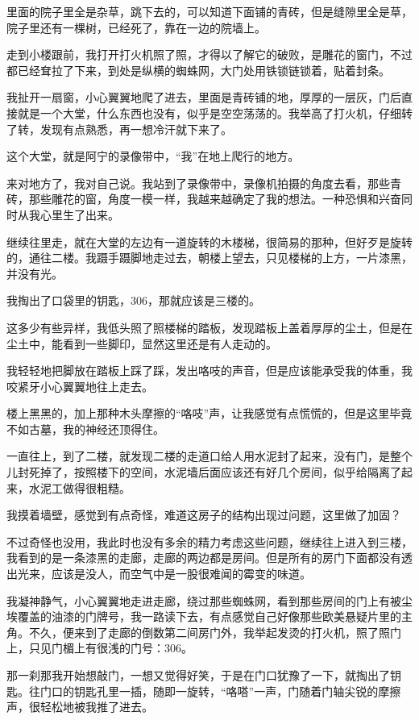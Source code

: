 里面的院子里全是杂草，跳下去的，可以知道下面铺的青砖，但是缝隙里全是草，院子里还有一棵树，已经死了，靠在一边的院墙上。

走到小楼跟前，我打开打火机照了照，才得以了解它的破败，是雕花的窗门，不过都已经耷拉了下来，到处是纵横的蜘蛛网，大门处用铁锁链锁着，贴着封条。

我扯开一扇窗，小心翼翼地爬了进去，里面是青砖铺的地，厚厚的一层灰，门后直接就是一个大堂，什么东西也没有，似乎是空空荡荡的。我举高了打火机，仔细转了转，发现有点熟悉，再一想冷汗就下来了。

这个大堂，就是阿宁的录像带中，“我”在地上爬行的地方。

来对地方了，我对自己说。我站到了录像带中，录像机拍摄的角度去看，那些青砖，那些雕花的窗，角度一模一样，我越来越确定了我的想法。一种恐惧和兴奋同时从我心里生了出来。

继续往里走，就在大堂的左边有一道旋转的木楼梯，很简易的那种，但好歹是旋转的，通往二楼。我蹑手蹑脚地走过去，朝楼上望去，只见楼梯的上方，一片漆黑，并没有光。

我掏出了口袋里的钥匙，306，那就应该是三楼的。

这多少有些异样，我低头照了照楼梯的踏板，发现踏板上盖着厚厚的尘土，但是在尘土中，能看到一些脚印，显然这里还是有人走动的。

我轻轻地把脚放在踏板上踩了踩，发出咯吱的声音，但是应该能承受我的体重，我咬紧牙小心翼翼地往上走去。

楼上黑黑的，加上那种木头摩擦的“咯吱”声，让我感觉有点慌慌的，但是这里毕竟不如古墓，我的神经还顶得住。

一直往上，到了二楼，就发现二楼的走道口给人用水泥封了起来，没有门，是整个儿封死掉了，按照楼下的空间，水泥墙后面应该还有好几个房间，似乎给隔离了起来，水泥工做得很粗糙。

我摸着墙壁，感觉到有点奇怪，难道这房子的结构出现过问题，这里做了加固？

不过奇怪也没用，我此时也没有多余的精力考虑这些问题，继续往上进入到三楼，我看到的是一条漆黑的走廊，走廊的两边都是房间。但是所有的房门下面都没有透出光来，应该是没人，而空气中是一股很难闻的霉变的味道。

我凝神静气，小心翼翼地走进走廊，绕过那些蜘蛛网，看到那些房间的门上有被尘埃覆盖的油漆的门牌号，我一路读下去，有点感觉自己好像那些欧美悬疑片里的主角。不久，便来到了走廊的倒数第二间房门外，我举起发烫的打火机，照了照门上，只见门楣上有很浅的门号：306。

那一刹那我开始想敲门，一想又觉得好笑，于是在门口犹豫了一下，就掏出了钥匙。往门口的钥匙孔里一插，随即一旋转，“咯嗒”一声，门随着门轴尖锐的摩擦声，很轻松地被我推了进去。

